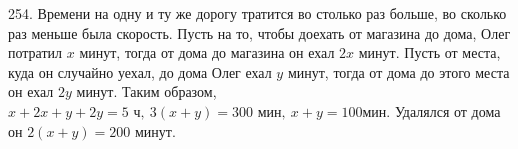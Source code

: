 254. Времени на одну и ту же дорогу тратится во столько раз больше, во сколько раз меньше была скорость. Пусть на то, чтобы доехать от магазина до дома, Олег потратил $x$ минут, тогда от дома до магазина он ехал $2x$ минут. Пусть от места, куда он случайно уехал, до дома Олег ехал $y$ минут, тогда от дома до этого места он ехал $2y$ минут. Таким образом, $x+2x+y+2y=5\text{ ч},\ 3(x+y)=300\text{ мин},\ x+y=100$мин. Удалялся от дома он $2(x+y)=200$ минут.\\
